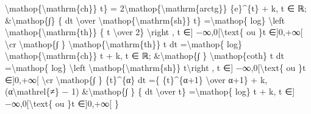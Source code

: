 \documentclass[]{article}
\begin{document}
\textbackslash{}mathop\{\textbackslash{}mathrm\{ch\}\} t\} =
2\textbackslash{}mathop\{\textbackslash{}mathrm\{arctg\}\}
\{e\}\^{}\{t\} + k, t ∈ ℝ; \&\textbackslash{}mathop\{∫\} \{ dt
\textbackslash{}over
\textbackslash{}mathop\{\textbackslash{}mathrm\{sh\}\} t\}
=\textbackslash{}mathop\{ log\} \textbackslash{}left
\textbar{}\textbackslash{}mathop\{\textbackslash{}mathrm\{th\}\} \{ t
\textbackslash{}over 2\} \textbackslash{}right \textbar{}, t ∈{]}
−∞,0{[}\textbackslash{}text\{ ou \}t ∈{]}0,+∞{[} \textbackslash{}cr
\textbackslash{}mathop\{∫ \}
\textbackslash{}mathop\{\textbackslash{}mathrm\{th\}\} t dt
=\textbackslash{}mathop\{ log\}
\textbackslash{}mathop\{\textbackslash{}mathrm\{ch\}\} t + k, t ∈ ℝ;
\&\textbackslash{}mathop\{∫ \} \textbackslash{}mathop\{coth\} t dt
=\textbackslash{}mathop\{ log\} \textbackslash{}left
\textbar{}\textbackslash{}mathop\{\textbackslash{}mathrm\{sh\}\}
t\textbackslash{}right \textbar{}, t ∈{]} −∞,0{[}\textbackslash{}text\{
ou \}t ∈{]}0,+∞{[} \textbackslash{}cr \textbackslash{}mathop\{∫ \}
\{t\}\^{}\{α\} dt =\{ \{t\}\^{}\{α+1\} \textbackslash{}over α+1\} + k,
(α\textbackslash{}mathrel\{≠\} − 1) \&\textbackslash{}mathop\{∫ \} \{ dt
\textbackslash{}over t\} =\textbackslash{}mathop\{ log\}
\textbar{}t\textbar{} + k, t ∈{]} −∞,0{[}\textbackslash{}text\{ ou \}t
∈{]}0,+∞{[} \}
\end{document}
